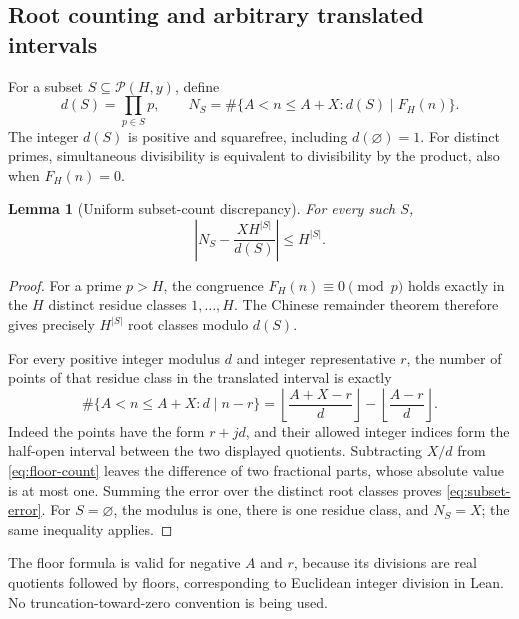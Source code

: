 \documentclass[11pt,a4paper]{article}
\newtheorem{lemma}[theorem]{Lemma}
\theoremstyle{definition}
\theoremstyle{remark}
\numberwithin{equation}{section}
\newcommand{\Pset}{\mathcal P}
\newcommand{\floor}[1]{\left\lfloor #1\right\rfloor}
\begin{document}
\subsection{Root counting and arbitrary translated intervals}
For a subset $S\subseteq\Pset(H,y)$, define
\[
 d(S)=\prod_{p\in S}p,\qquad
 N_S=\#\{A<n\le A+X:d(S)\mid F_H(n)\}.
\]
The integer $d(S)$ is positive and squarefree, including $d(\varnothing)=1$.
For distinct primes, simultaneous divisibility is equivalent to divisibility by
the product, also when $F_H(n)=0$.

\begin{lemma}[Uniform subset-count discrepancy]\label{lem:crt}
For every such $S$,
\begin{equation}\label{eq:subset-error}
 \left|N_S-\frac{XH^{|S|}}{d(S)}\right|\le H^{|S|}.
\end{equation}
\end{lemma}
\begin{proof}
For a prime $p>H$, the congruence $F_H(n)\equiv0\pmod p$ holds exactly in the
$H$ distinct residue classes $1,\ldots,H$. The Chinese remainder theorem
therefore gives precisely $H^{|S|}$ root classes modulo $d(S)$.

For every positive integer modulus $d$ and integer representative $r$, the
number of points of that residue class in the translated interval is exactly
\begin{equation}\label{eq:floor-count}
 \#\{A<n\le A+X:d\mid n-r\}
 =\floor{\frac{A+X-r}{d}}-\floor{\frac{A-r}{d}}.
\end{equation}
Indeed the points have the form $r+jd$, and their allowed integer indices form
the half-open interval between the two displayed quotients. Subtracting $X/d$
from \eqref{eq:floor-count} leaves the difference of two fractional parts,
whose absolute value is at most one. Summing the error over the distinct root
classes proves \eqref{eq:subset-error}. For $S=\varnothing$, the modulus is
one, there is one residue class, and $N_S=X$; the same inequality applies.
\end{proof}
The floor formula is valid for negative $A$ and $r$, because its divisions are
real quotients followed by floors, corresponding to Euclidean integer division
in Lean. No truncation-toward-zero convention is being used.
\end{document}

